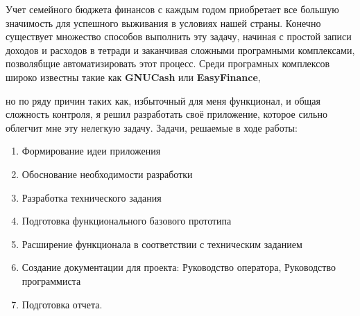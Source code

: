 Учет семейного бюджета финансов с каждым годом приобретает все большую значимость для успешного выживания в условиях нашей страны. Конечно существует множество способов выполнить эту задачу, начиная с простой
записи доходов и расходов в тетради и заканчивая сложными програмными
комплексами, позволябщие автоматизировать этот процесс. Среди програмных комплексов широко известны такие как \textbf{GNUCash} или \textbf{EasyFinance},

но по ряду причин таких как, избыточный для меня функционал, и общая сложность контроля, я решил разработать своё приложение, которое сильно облегчит мне эту нелегкую задачу.
Задачи, решаемые в ходе работы:
\begin{enumerate}
\item Формирование идеи приложения
\item Обоснование необходимости разработки
\item Разработка технического задания
\item Подготовка функционального базового прототипа
\item Расширение функционала в соответствии с техническим заданием
\item Создание документации для проекта: Руководство оператора, Руководство программиста
\item Подготовка отчета. 
\end{enumerate}

